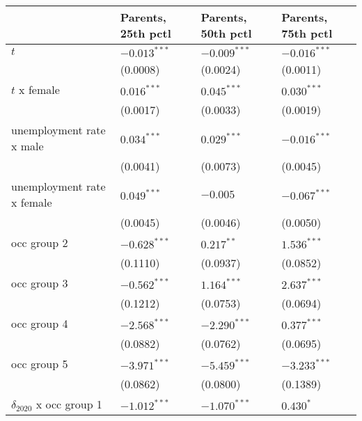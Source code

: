 \begin{tabular}{llll}
\toprule
{} & Parents, 25th pctl & Parents, 50th pctl & Parents, 75th pctl \\
\midrule
$t$                                    &     $-0.013^{***}$ &     $-0.009^{***}$ &     $-0.016^{***}$ \\
                                       &           (0.0008) &           (0.0024) &           (0.0011) \\
$t$ x female                           &      $0.016^{***}$ &      $0.045^{***}$ &      $0.030^{***}$ \\
                                       &           (0.0017) &           (0.0033) &           (0.0019) \\
unemployment rate x male               &      $0.034^{***}$ &      $0.029^{***}$ &     $-0.016^{***}$ \\
                                       &           (0.0041) &           (0.0073) &           (0.0045) \\
unemployment rate x female             &      $0.049^{***}$ &           $-0.005$ &     $-0.067^{***}$ \\
                                       &           (0.0045) &           (0.0046) &           (0.0050) \\
occ group 2                            &     $-0.628^{***}$ &       $0.217^{**}$ &      $1.536^{***}$ \\
                                       &           (0.1110) &           (0.0937) &           (0.0852) \\
occ group 3                            &     $-0.562^{***}$ &      $1.164^{***}$ &      $2.637^{***}$ \\
                                       &           (0.1212) &           (0.0753) &           (0.0694) \\
occ group 4                            &     $-2.568^{***}$ &     $-2.290^{***}$ &      $0.377^{***}$ \\
                                       &           (0.0882) &           (0.0762) &           (0.0695) \\
occ group 5                            &     $-3.971^{***}$ &     $-5.459^{***}$ &     $-3.233^{***}$ \\
                                       &           (0.0862) &           (0.0800) &           (0.1389) \\
$\delta_{2020}$ x occ group 1          &     $-1.012^{***}$ &     $-1.070^{***}$ &          $0.430^*$ \\

\end{tabular}
